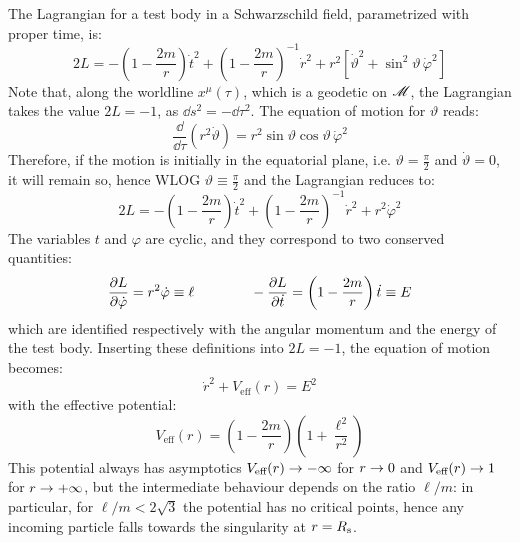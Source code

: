 The Lagrangian for a test body in a Schwarzschild field, parametrized with proper time, is:
\begin{equation*}
    2L = - \left( 1 - \frac{2m}{r} \right) \dot{t}^2 + \left( 1 - \frac{2m}{r} \right)^{-1} \dot{r}^2 + r^2 \left[ \dot{\vartheta}^2 + \sin^2 \vartheta \, \dot{\varphi}^2 \right]
\end{equation*}
Note that, along the worldline $ x^\mu(\tau) $, which is a geodetic on $ \mathscr{M} $, the Lagrangian takes the value $ 2L = -1 $, as $ \dd s^2 = - \dd \tau^2 $. The equation of motion for $ \vartheta $ reads:
\begin{equation*}
  \frac{\dd}{\dd \tau} (r^2 \dot{\vartheta}) = r^2 \sin \vartheta \cos \vartheta \, \dot{\varphi}^2
\end{equation*}
Therefore, if the motion is initially in the equatorial plane, i.e. $ \vartheta = \frac{\pi}{2} $ and $ \dot{\vartheta} = 0 $, it will remain so, hence WLOG $ \vartheta \equiv \frac{\pi}{2} $ and the Lagrangian reduces to:
\begin{equation}
  2L = - \left( 1 - \frac{2m}{r} \right) \dot{t}^2 + \left( 1 - \frac{2m}{r} \right)^{-1} \dot{r}^2 + r^2 \dot{\varphi}^2
  \label{eq:schwarz-lag}
\end{equation}
The variables $ t $ and $ \varphi $ are cyclic, and they correspond to two conserved quantities:
\begin{equation}
  \frac{\partial L}{\partial \dot{\varphi}} = r^2 \dot{\varphi} \equiv \ell
  \qquad \qquad
  - \frac{\partial L}{\partial \dot{t}} = \left( 1 - \frac{2m}{r} \right) \dot{t} \equiv E
  \label{eq:schwarz-energy}
\end{equation}
which are identified respectively with the angular momentum and the energy of the test body. Inserting these definitions into $ 2L = -1 $, the equation of motion becomes:
\begin{equation}
  \dot{r}^2 + V_\text{eff}(r) = E^2
\end{equation}
with the effective potential:
\begin{equation}
  V_\text{eff}(r) = \left( 1 - \frac{2m}{r} \right) \left( 1 + \frac{\ell^2}{r^2} \right)
  \label{eq:schwarz-effective-pot}
\end{equation}
This potential always has asymptotics $ V_\text{eff}(r) \rightarrow -\infty $ for $ r \rightarrow 0 $ and $ V_\text{eff}(r) \rightarrow 1 $ for $ r \rightarrow + \infty $, but the intermediate behaviour depends on the ratio $ \ell / m $: in particular, for $ \ell / m < 2 \sqrt{3} $ the potential has no critical points, hence any incoming particle falls towards the singularity at $ r = R_\text{s} $.


